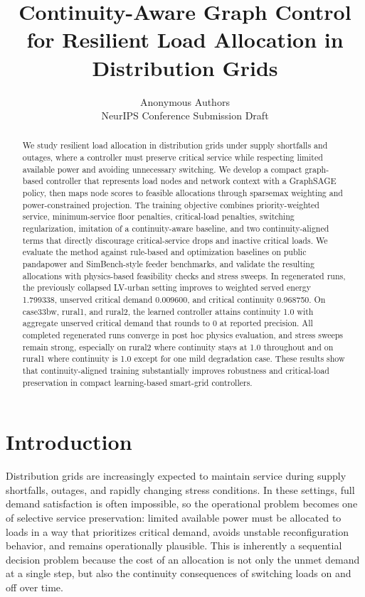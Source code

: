 \documentclass[11pt]{article}
\title{Continuity-Aware Graph Control for Resilient Load Allocation in Distribution Grids}
\author{Anonymous Authors \\
NeurIPS Conference Submission Draft}
\date{}
\begin{document}
\maketitle

\begin{abstract}
We study resilient load allocation in distribution grids under supply shortfalls and outages, where a controller must preserve critical service while respecting limited available power and avoiding unnecessary switching. We develop a compact graph-based controller that represents load nodes and network context with a GraphSAGE policy, then maps node scores to feasible allocations through sparsemax weighting and power-constrained projection. The training objective combines priority-weighted service, minimum-service floor penalties, critical-load penalties, switching regularization, imitation of a continuity-aware baseline, and two continuity-aligned terms that directly discourage critical-service drops and inactive critical loads. We evaluate the method against rule-based and optimization baselines on public pandapower and SimBench-style feeder benchmarks, and validate the resulting allocations with physics-based feasibility checks and stress sweeps. In regenerated runs, the previously collapsed LV-urban setting improves to weighted served energy 1.799338, unserved critical demand 0.009600, and critical continuity 0.968750. On case33bw, rural1, and rural2, the learned controller attains continuity 1.0 with aggregate unserved critical demand that rounds to 0 at reported precision. All completed regenerated runs converge in post hoc physics evaluation, and stress sweeps remain strong, especially on rural2 where continuity stays at 1.0 throughout and on rural1 where continuity is 1.0 except for one mild degradation case. These results show that continuity-aligned training substantially improves robustness and critical-load preservation in compact learning-based smart-grid controllers.
\end{abstract}

\section{Introduction}

Distribution grids are increasingly expected to maintain service during supply shortfalls, outages, and rapidly changing stress conditions. In these settings, full demand satisfaction is often impossible, so the operational problem becomes one of selective service preservation: limited available power must be allocated to loads in a way that prioritizes critical demand, avoids unstable reconfiguration behavior, and remains operationally plausible. This is inherently a sequential decision problem because the cost of an allocation is not only the unmet demand at a single step, but also the continuity consequences of switching loads on and off over time.
\end{document}
